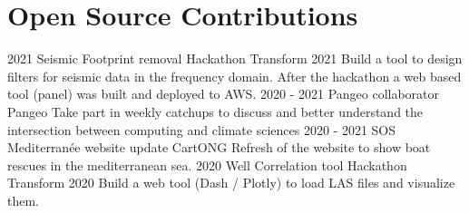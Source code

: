 \documentclass[]{friggeri-cv}
\begin{document}
\section{Open Source Contributions}
\begin{entrylist}
	\entry
	{2021}
	{Seismic Footprint removal Hackathon}
	{Transform 2021}
	{Build a tool to design filters for seismic data in the frequency domain. After the hackathon a web based tool (panel) was built and deployed to AWS.}
	\entry
	{2020 - 2021}
	{Pangeo collaborator}
	{Pangeo}
	{Take part in weekly catchups to discuss and better understand the intersection between computing and climate sciences}
	\entry
	{2020 - 2021}
	{SOS Mediterranée website update}
	{CartONG}
	{Refresh of the website to show boat rescues in the mediterranean sea.}
	\entry
	{2020}
	{Well Correlation tool Hackathon}
	{Transform 2020}
	{Build a web tool (Dash / Plotly) to load LAS files and visualize them.}
\end{entrylist}
\end{document}
